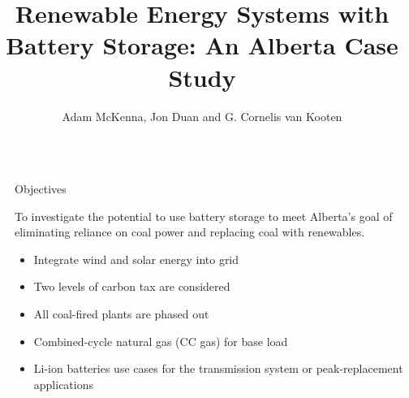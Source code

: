 \documentclass[final]{beamer}
\title{Renewable Energy Systems with Battery Storage: An Alberta Case Study} %
\author{Adam McKenna, Jon Duan and G. Cornelis van Kooten} %
\institute{Department of Economics -  University of Victoria} %
\newlength{\sepwid}
\newlength{\onecolwid}
\begin{document}

\setlength{\belowcaptionskip}{2ex} %
\setlength\belowdisplayshortskip{2ex} %

\begin{frame}[t] %

\begin{columns}[t] %

\begin{column}{\sepwid}\end{column} %

\begin{column}{\onecolwid} %


\begin{alertblock}{Objectives}

To investigate the potential to use battery storage to meet Alberta's goal of eliminating reliance on coal power  and replacing coal with renewables.
\begin{itemize}
\item Integrate wind and solar energy into grid
\item Two levels of carbon tax are considered
\item All coal-fired plants are phased out  
\item Combined-cycle natural gas (CC gas) for base load
\item Li-ion batteries use cases for the transmission system or peak-replacement applications
\end{itemize}

\end{alertblock}



\end{column}
\end{columns}
\end{frame}
\end{document}
